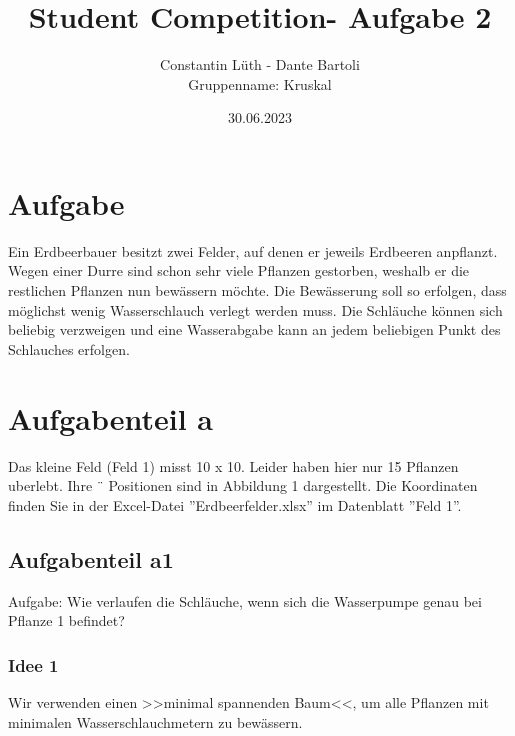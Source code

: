 \documentclass[12pt,titlepage]{article}
\numberwithin{equation}{section}
\begin{document}
\begin{titlepage}
    \title{Student Competition- Aufgabe 2}
    \date{30.06.2023}
    \author{Constantin Lüth - Dante Bartoli\\ Gruppenname: Kruskal }
    \maketitle
\end{titlepage}
 
\setcounter{page}{2} 
\tableofcontents
\newpage


\section{Aufgabe}
Ein Erdbeerbauer besitzt zwei Felder, auf denen er jeweils Erdbeeren anpflanzt. Wegen einer
Durre sind schon sehr viele Pflanzen gestorben, weshalb er die restlichen Pflanzen nun bewässern
möchte. Die Bewässerung soll so erfolgen, dass möglichst wenig Wasserschlauch verlegt werden
muss. Die Schläuche können sich beliebig verzweigen und eine Wasserabgabe kann an jedem
beliebigen Punkt des Schlauches erfolgen.

\section{Aufgabenteil a}
Das kleine Feld (Feld 1) misst 10 x 10. Leider haben hier nur 15 Pflanzen uberlebt. Ihre ¨
Positionen sind in Abbildung 1 dargestellt. Die Koordinaten finden Sie in der Excel-Datei
”Erdbeerfelder.xlsx” im Datenblatt ”Feld 1”.

\subsection{Aufgabenteil a1}
Aufgabe: Wie verlaufen die Schläuche, wenn sich die Wasserpumpe genau bei Pflanze 1 befindet?
\subsubsection*{Idee 1}

Wir verwenden einen >>minimal spannenden Baum<<, um alle Pflanzen mit minimalen Wasserschlauchmetern zu bewässern.



\end{document}
